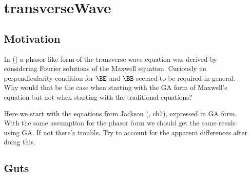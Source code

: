 

\chapter{transverseWave}
\label{chap:transverseWave}
{}
\date{August 6, 2009}

\beginArtWithToc

\section{Motivation}

In (\cite{maxwellVacuum}) a phasor like form of the transverse wave equation was derived by considering Fourier solutions of the Maxwell equation.  Curiously no perpendicularity condition for $\BE$ and $\BB$ seemed to be required in general.  Why would that be the case when starting with the GA form of Maxwell's equation but not when starting with the traditional equations?

Here we start with the equations from Jackson (\cite{jackson1975cew}, ch7), expressed in GA form.  With the same assumption for the phasor form we should get the same resuls using GA.  If not there's trouble.  Try to account for the apparent differences after doing this.

\section{Guts}

\EndArticle
